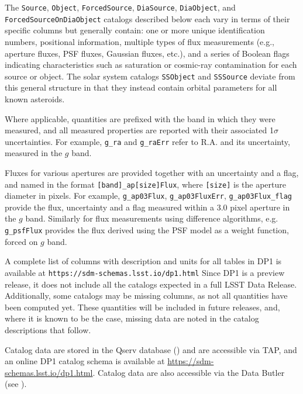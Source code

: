 The \texttt{Source}, \texttt{Object}, \texttt{ForcedSource}, \texttt{DiaSource}, \texttt{DiaObject}, and \texttt{ForcedSourceOnDiaObject} catalogs described below each vary in terms of their specific columns but generally contain: one or more unique identification numbers, positional information, multiple types of \gls{flux} measurements (e.g., aperture fluxes, \gls{PSF} fluxes, Gaussian fluxes, etc.), and a series of Boolean flags indicating characteristics such as saturation or cosmic-ray contamination for each source or object.
The solar system catalogs \texttt{SSObject} and \texttt{SSSource} deviate from this general structure in that they instead contain orbital parameters for all known asteroids.

Where applicable, quantities are prefixed with the band in which they were measured, and all measured properties are reported with their associated 1$\sigma$ uncertainties.
For example, \texttt{g\_ra} and \texttt{g\_raErr} refer to R.A. and its uncertainty, measured in the $g$ band.

Fluxes for various apertures are provided together with an uncertainty and  a flag, and named in the format \texttt{[band]\_ap[size]Flux}, where \texttt{[size]} is the aperture diameter in pixels.
For example, \texttt{g\_ap03Flux}, \texttt{g\_ap03FluxErr}, \texttt{g\_ap03Flux\_flag} provide the flux, uncertainty and a flag measured within a 3.0 pixel aperture in the $g$ band.
Similarly for flux measurements using difference algorithms, e.g. \texttt{g\_psfFlux} provides the flux derived using the PSF model as a weight function, forced on $g$ band.

A complete list of columns  with description and units for all tables in DP1 is available at \nolinkurl{https://sdm-schemas.lsst.io/dp1.html}
Since \gls{DP1} is a preview release, it does not include all the catalogs expected in a full \gls{LSST} \gls{Data Release}.
Additionally, some catalogs may be missing columns, as not all quantities have been computed yet.
These quantities will be included in future releases, and, where it is known to be the case,  missing data are noted in the catalog descriptions that follow.

Catalog data are stored in the \gls{Qserv} database () and are accessible via \gls{TAP}, and an online \gls{DP1} catalog \gls{schema} is available at \url{https://sdm-schemas.lsst.io/dp1.html}.
Catalog data are also accessible via the Data \gls{Butler} (see ).

